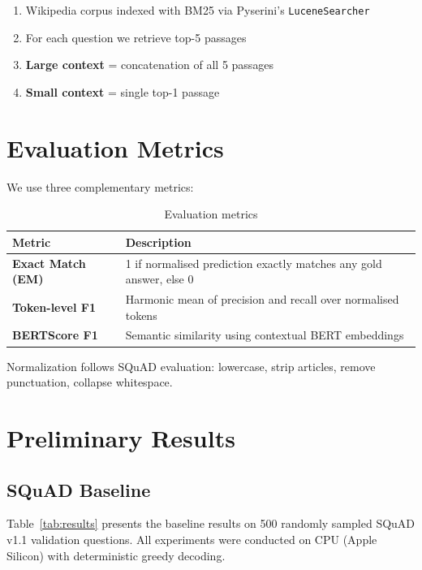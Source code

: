 \documentclass[11pt,a4paper]{article}
\begin{document}
\begin{enumerate}
    \item Wikipedia corpus indexed with BM25 via Pyserini's \texttt{LuceneSearcher}
    \item For each question we retrieve top-5 passages
    \item \textbf{Large context} = concatenation of all 5 passages
    \item \textbf{Small context} = single top-1 passage
\end{enumerate}

\section{Evaluation Metrics}

We use three complementary metrics:

\begin{table}[H]
\centering
\caption{Evaluation metrics}
\label{tab:metrics}
\begin{tabularx}{\textwidth}{@{} L{3cm} X @{}}
\toprule
\textbf{Metric} & \textbf{Description} \\
\midrule
\textbf{Exact Match (EM)} & 1 if normalised prediction exactly matches any gold answer, else 0 \\
\textbf{Token-level F1} & Harmonic mean of precision and recall over normalised tokens \\
\textbf{BERTScore F1} & Semantic similarity using contextual BERT embeddings \\
\bottomrule
\end{tabularx}
\end{table}

Normalization follows SQuAD evaluation: lowercase, strip articles, remove punctuation, collapse whitespace.

\section{Preliminary Results}

\subsection{SQuAD Baseline}

Table~\ref{tab:results} presents the baseline results on 500 randomly sampled SQuAD v1.1 validation questions. All experiments were conducted on CPU (Apple Silicon) with deterministic greedy decoding.
\end{document}

